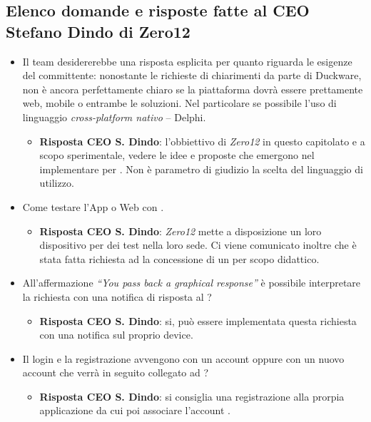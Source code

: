 	\subsection{Elenco domande e risposte fatte al CEO Stefano Dindo di Zero12}
		\begin{itemize}
			\item Il team desidererebbe una risposta esplicita per quanto riguarda le esigenze del committente: nonostante le richieste di chiarimenti  da parte di Duckware, non è ancora perfettamente chiaro se la piattaforma dovrà  essere prettamente web, mobile o entrambe le soluzioni. Nel particolare se possibile l'uso di linguaggio \emph{cross-platform nativo} – Delphi.
			\begin{itemize}
				\item \textbf{Risposta CEO S. Dindo}: l'obbiettivo di \emph{Zero12} in questo capitolato e a scopo sperimentale, vedere le idee e proposte che emergono nel implementare \emph{} per \emph{}. Non è parametro di giudizio la scelta del linguaggio di utilizzo.
			\end{itemize}
			\item Come testare l’App o Web con .
			\begin{itemize}
				\item \textbf{Risposta CEO S. Dindo}: \emph{Zero12} mette a disposizione un loro dispositivo per dei test nella loro sede. Ci viene comunicato inoltre che è stata fatta richiesta ad  la concessione di un \emph{ } per scopo didattico.
			\end{itemize}
			\item All'affermazione \emph{“You pass back a graphical response”} è possibile interpretare la richiesta con una notifica di risposta al ?
			\begin{itemize}
				\item \textbf{Risposta CEO S. Dindo}: si, può essere implementata questa richiesta con una notifica sul proprio device.
			\end{itemize}
			\item Il login e la registrazione avvengono con un account   oppure con un nuovo account che verrà in seguito collegato ad  ?
			\begin{itemize}
				\item \textbf{Risposta CEO S. Dindo}: si consiglia una registrazione alla prorpia applicazione da cui poi associare l'account \emph{}.

\end{itemize}
\end{itemize}
